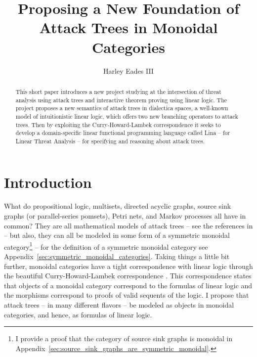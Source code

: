 \documentclass{llncs}
\date{}
\begin{document}
\title{Proposing a New Foundation of Attack Trees in Monoidal Categories}

\author{Harley Eades III}

\maketitle 

\begin{abstract}
  This short paper introduces a new project studying at the
  intersection of threat analysis using attack trees and interactive
  theorem proving using linear logic.  The project proposes a new
  semantics of attack trees in dialectica spaces, a well-known model
  of intuitionistic linear logic, which offers two new branching
  operators to attack trees.  Then by exploiting the
  Curry-Howard-Lambek correspondence it seeks to develop a
  domain-specific linear functional programming language called Lina
  -- for Linear Threat Analysis -- for specifying and reasoning about
  attack trees.
\end{abstract}

\section{Introduction}
\label{sec:introduction}

What do propositional logic, multisets, directed acyclic graphs,
source sink graphs (or parallel-series pomsets), Petri nets, and
Markov processes all have in common?  They are all mathematical models
of attack trees -- see the references in
\cite{Kordy:2014a,Jhawar:2015} -- but also, they can all be modeled in
some form of a symmetric monoidal category\footnote{I provide a proof
  that the category of source sink graphs is monoidal in
  Appendix~\ref{sec:source_sink_graphs_are_symmetric_monoidal}.}
\cite{Tzouvaras:1998,Brown:1991,Fiore:2013,FrancescoAlbasini2010} --
for the definition of a symmetric monoidal category see
Appendix~\ref{sec:symmetric_monoidal_categories}.  Taking things a
little bit further, monoidal categories have a tight correspondence
with linear logic through the beautiful Curry-Howard-Lambek
correspondence \cite{MSC:4439568}.  This correspondence states that
objects of a monoidal category correspond to the formulas of linear
logic and the morphisms correspond to proofs of valid sequents of the
logic.  I propose that attack trees -- in many different flavors -- be
modeled as objects in monoidal categories, and hence, as formulas of
linear logic.
\end{document}
